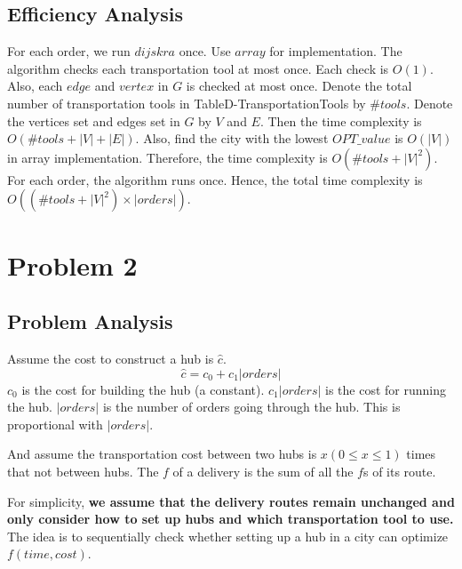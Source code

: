 \documentclass[11pt, a4paper]{article} %
\begin{document}
	\subsection{Efficiency Analysis}
	For each order, we run $dijskra$ once. Use $array$ for implementation. The algorithm checks each transportation tool at most once. Each check is $O(1)$. Also, each $edge$ and $vertex$ in $G$ is checked at most once. Denote the total number of transportation tools in TableD-TransportationTools by $\#tools$. Denote the vertices set and edges set in $G$ by $V$ and $E$. Then the time complexity is $O(\#tools+|V|+|E|)$. Also, find the city with the lowest $OPT\_value$ is $O(|V|)$ in array implementation. Therefore, the time complexity is $O(\#tools+|V|^2)$. For each order, the algorithm runs once. Hence, the total time complexity is $O((\#tools+|V|^2)\times |orders|)$.
\section{Problem 2}
	\subsection{Problem Analysis}\label{2-PA}
	Assume the cost to construct a hub is $\hat{c}$. 
	$$\hat{c}=c_0+c_1|orders|$$
	$c_0$ is the cost for building the hub (a constant). $c_1|orders|$ is the cost for running the hub. $|orders|$ is the number of orders going through the hub. This is proportional with  $|orders|$.
	
	And assume the transportation cost between two hubs is $x(0\leq x\leq 1)$ times that not between hubs. The $f$ of a delivery is the sum of all the $f$s of its route.\par
	\indent For simplicity, \textbf{we assume that the delivery routes remain unchanged and only consider how to set up hubs and which transportation tool to use.} The idea is to sequentially check whether setting up a hub in a city can optimize $f(time,cost)$.
	
\end{document}
